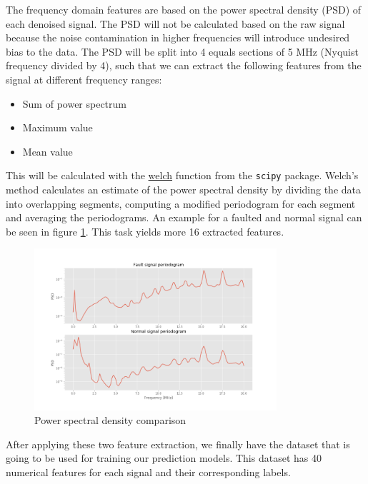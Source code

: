 \documentclass[11pt]{article}
\providecommand{\tightlist}{%
      \setlength{\itemsep}{0pt}\setlength{\parskip}{0pt}}
\begin{document}
The frequency domain features are based on the power spectral density
(PSD) of each denoised signal. The PSD will not be calculated based on
the raw signal because the noise contamination in higher frequencies
will introduce undesired bias to the data. The PSD will be split into 4
equals sections of 5 MHz (Nyquist frequency divided by 4), such that we
can extract the following features from the signal at different
frequency ranges:

\begin{itemize}
\tightlist
\item
  Sum of power spectrum
\item
  Maximum value
\item
  Mean value
\end{itemize}

This will be calculated with the
\href{https://docs.scipy.org/doc/scipy-0.14.0/reference/generated/scipy.signal.welch.html}{welch}
function from the \texttt{scipy} package. Welch's method calculates an
estimate of the power spectral density by dividing the data into
overlapping segments, computing a modified periodogram for each segment
and averaging the periodograms. An example for a faulted and normal
signal can be seen in figure \ref{fig:pdsignal_psd}. This task yields more 16
extracted features.

\begin{figure}[h]
\centering
\includegraphics[width=0.8\textwidth]{signal_fault_normal_psd_denoised.png}
\caption{Power spectral density comparison}
\label{fig:pdsignal_psd}
\end{figure}

After applying these two feature extraction, we finally have the dataset
that is going to be used for training our prediction models. This
dataset has 40 numerical features for each signal and their
corresponding labels.
\end{document}
